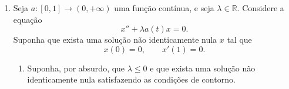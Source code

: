 \documentclass[a4paper,11pt,reqno]{amsart}
\begin{document}
\begin{enumerate}
\begin{enumerate}
\item A solução geral da homogênea é
\[
    y_h(t)=C_1t+C_2t^2.
\]

Para encontrar uma solução particular da equação não homogênea
\[
    t^2y''-2ty'+2y=t^3,
\]
tentamos
\[
    y_p(t)=At^3.
\]
Então
\[
    y_p'(t)=3At^2,
    \qquad
    y_p''(t)=6At.
\]
Substituindo,
\[
    t^2(6At)-2t(3At^2)+2At^3
    =
    6At^3-6At^3+2At^3
    =
    2At^3.
\]
Queremos que isso seja igual a $t^3$, logo
\[
    2A=1,
    \qquad
    A=\frac12.
\]
Assim,
\[
    y_p(t)=\frac12t^3.
\]
Portanto a solução geral é
\[
    \boxed{y(t)=C_1t+C_2t^2+\frac12t^3.}
\]

\item Devemos impor
\[
    y(1)=0,
    \qquad
    y'(1)=1.
\]
Temos
\[
    y(t)=C_1t+C_2t^2+\frac12t^3
\]
e
\[
    y'(t)=C_1+2C_2t+\frac32t^2.
\]
Logo
\[
    y(1)=C_1+C_2+\frac12=0,
\]
isto é,
\[
    C_1+C_2=-\frac12.
\]
Além disso,
\[
    y'(1)=C_1+2C_2+\frac32=1,
\]
isto é,
\[
    C_1+2C_2=-\frac12.
\]
Subtraindo a primeira equação da segunda, obtemos
\[
    C_2=0.
\]
Então
\[
    C_1=-\frac12.
\]
Portanto
\[
    \boxed{
    y(t)=\frac12t^3-\frac12t.
    }
\]

Como a equação está definida para $t>0$, e o ponto inicial é $t=1$, o maior intervalo natural de existência é
\[
    \boxed{(0,+\infty).}
\]

\end{enumerate}


\item Seja $a:[0,1]\to(0,+\infty)$ uma função contínua, e seja $\lambda\in\mathbb{R}$. Considere a equação
\[
    x''+\lambda a(t)x=0.
\]
Suponha que exista uma solução não identicamente nula $x$ tal que
\[
    x(0)=0,
    \qquad
    x'(1)=0.
\]

\begin{enumerate}

\item Suponha, por absurdo, que $\lambda\leq 0$ e que exista uma solução não identicamente nula satisfazendo as condições de contorno.


\end{enumerate}
\end{enumerate}
\end{document}
